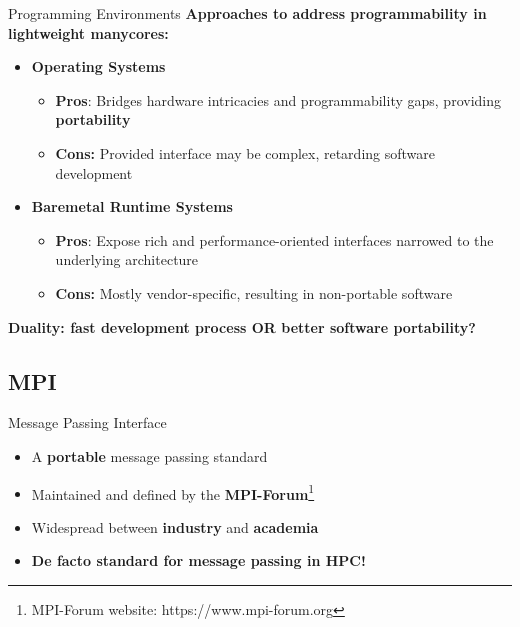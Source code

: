 \documentclass[english,aspectratio=169]{lapesd-slides}
\begin{document}
      \begin{frame}{Programming Environments}
        \textbf{Approaches to address programmability in lightweight manycores:}
        \vspace{0.2cm}
        \begin{itemize}
          \item \textbf{Operating Systems}
          \begin{itemize}
            \item \textbf{Pros}: Bridges hardware intricacies and programmability gaps, providing
              \textbf{portability}
            \item \textbf{Cons:} Provided interface may be complex, retarding
              software development
          \end{itemize}

          \item \textbf{Baremetal Runtime Systems}
          \begin{itemize}
            \item \textbf{Pros}: Expose rich and performance-oriented interfaces narrowed to the
              underlying architecture
            \item \textbf{Cons:} Mostly vendor-specific, resulting in
              non-portable software
          \end{itemize}
        \end{itemize}

        \bigskip
        \textbf{Duality: fast development process OR better software portability?}
      \end{frame}

    \subsection{MPI}
      \begin{frame}{Message Passing Interface}
        \begin{itemize}
          \item A \textbf{portable} message passing standard
          \item Maintained and defined by the \textbf{MPI-Forum}\footnote[frame]{\scriptsize MPI-Forum website: https://www.mpi-forum.org }
          \item Widespread between \textbf{industry} and \textbf{academia}
          \bigskip
          \item \textbf{De facto standard for message passing in HPC!}
        \end{itemize}
      \end{frame}
\end{document}
